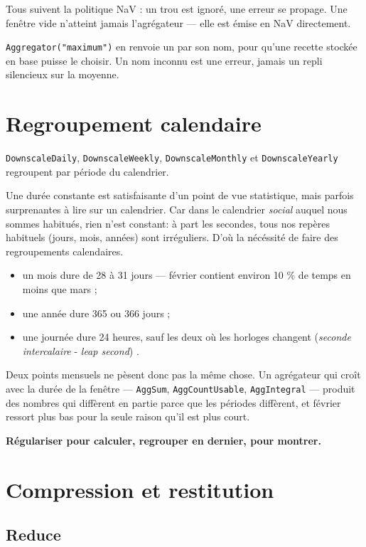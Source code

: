 \documentclass[11pt,a4paper]{report}
\providecommand{\tightlist}{\setlength{\itemsep}{0pt}\setlength{\parskip}{0pt}}
\begin{document}
Tous suivent la politique NaV : un trou est ignoré, une erreur se
propage. Une fenêtre vide n'atteint jamais l'agrégateur --- elle est
émise en NaV directement.

\texttt{Aggregator("maximum")} en renvoie un par son nom, pour qu'une
recette stockée en base puisse le choisir. Un nom inconnu est une
erreur, jamais un repli silencieux sur la moyenne.

\chapter{Regroupement calendaire}\label{chap:calendrier}

\texttt{DownscaleDaily}, \texttt{DownscaleWeekly},
\texttt{DownscaleMonthly} et \texttt{DownscaleYearly} regroupent par
période du calendrier.

Une durée constante est satisfaisante d'un point de vue statistique, mais parfois surprenantes à lire sur un calendrier. Car dans le calendrier \textit{social} auquel
nous sommes habitués, rien n'est constant: à part les secondes, tous nos repères habituels (jours, mois, années) sont irréguliers. D'où la nécéssité de faire des regroupements calendaires.


\begin{itemize}
\tightlist
\item
  un mois dure de 28 à 31 jours --- février contient environ 10 \% de
  temps en moins que mars ;
\item
  une année dure 365 ou 366 jours ;
\item
  une journée dure 24 heures, sauf les deux où les horloges changent (\textit{seconde intercalaire} - \textit{leap second}) .
\end{itemize}

Deux points mensuels ne pèsent donc pas la même chose. Un agrégateur qui
croît avec la durée de la fenêtre --- \texttt{AggSum},
\texttt{AggCountUsable}, \texttt{AggIntegral} --- produit des nombres
qui diffèrent en partie parce que les périodes diffèrent, et février
ressort plus bas pour la seule raison qu'il est plus court.

\textbf{Régulariser pour calculer, regrouper en dernier, pour montrer.}

\chapter{Compression et restitution}\label{chap:reduction}

\section{Reduce}
\end{document}
